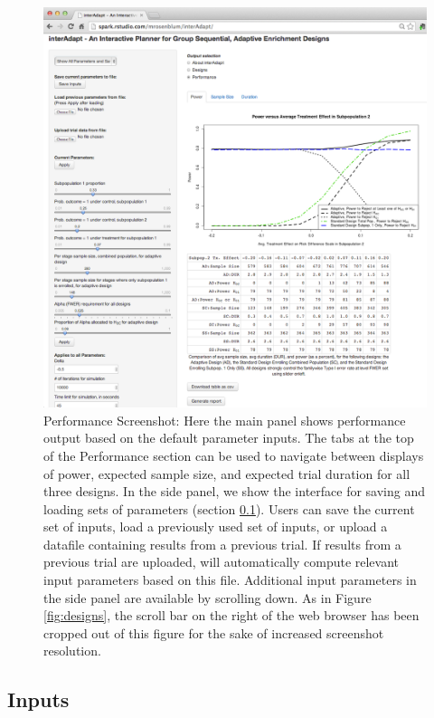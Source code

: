 \documentclass[article]{jss}
\begin{document}
\begin{figure}[h]
\centering{}\includegraphics[width=1\textwidth]{2014-02-29_screenshot_performance.png} 
\caption{Performance Screenshot: Here the main panel shows performance output based on the default parameter inputs. The tabs at the top of the Performance section can be used to navigate between displays of power, expected sample size, and expected trial duration for all three designs. In the side panel, we show the interface for saving and loading sets of parameters (section \ref{sub:inputs}). Users can save the current set of inputs, load a previously used set of inputs, or upload a datafile containing results from a previous trial. If results from a previous trial are uploaded,  will automatically compute relevant input parameters based on this file. Additional input parameters in the side panel are available by scrolling down. As in Figure \ref{fig:designs}, the scroll bar on the right of the web browser has been cropped out of this figure for the sake of increased screenshot resolution.  \label{fig:performance} }
\end{figure}%


\subsection{Inputs}
\label{sub:inputs}
\end{document}
